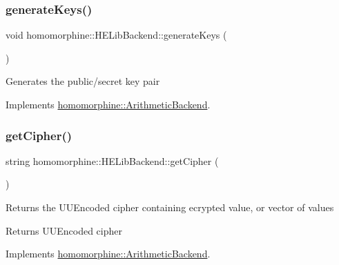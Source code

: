 \subsubsection{\texorpdfstring{generate\+Keys()}{generateKeys()}}
{\footnotesize\ttfamily void homomorphine\+::\+H\+E\+Lib\+Backend\+::generate\+Keys (\begin{DoxyParamCaption}{ }\end{DoxyParamCaption})\hspace{0.3cm}{\ttfamily [virtual]}}

Generates the public/secret key pair 

Implements \hyperlink{classhomomorphine_1_1_arithmetic_backend_a5faa0089b80be5629d4a0a7a02fe3568}{homomorphine\+::\+Arithmetic\+Backend}.

\mbox{\label{classhomomorphine_1_1_h_e_lib_backend_a9ba4311289e3b8c47f389f4f44de7d5d}} 
\subsubsection{\texorpdfstring{get\+Cipher()}{getCipher()}}
{\footnotesize\ttfamily string homomorphine\+::\+H\+E\+Lib\+Backend\+::get\+Cipher (\begin{DoxyParamCaption}{ }\end{DoxyParamCaption})\hspace{0.3cm}{\ttfamily [virtual]}}

Returns the U\+U\+Encoded cipher containing ecrypted value, or vector of values

\begin{DoxyReturn}{Returns}
U\+U\+Encoded cipher 
\end{DoxyReturn}


Implements \hyperlink{classhomomorphine_1_1_arithmetic_backend_acf38918fb556703ccb12b63dc73b15ed}{homomorphine\+::\+Arithmetic\+Backend}.

\mbox{\label{classhomomorphine_1_1_h_e_lib_backend_ab45838cc01a4e71425e2aa0279e12c0e}} 
